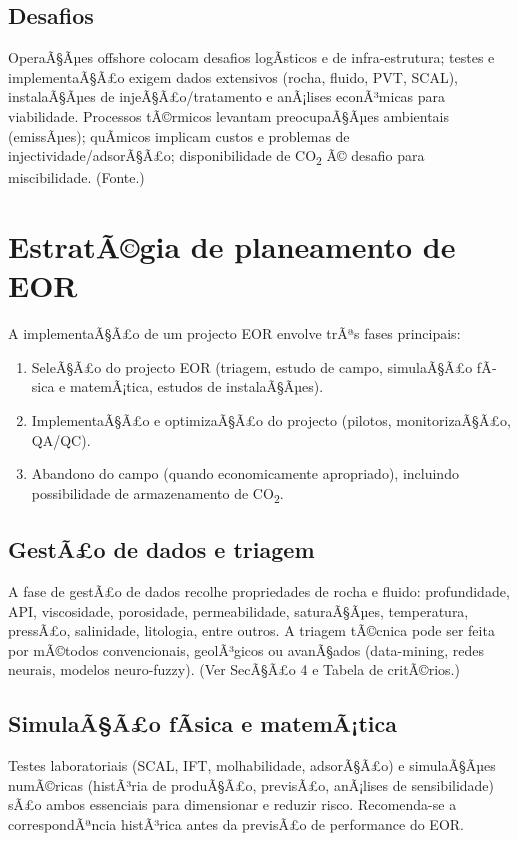\documentclass[11pt,a4paper]{article}
\begin{document}
\subsection{Desafios}
OperaÃ§Ãµes offshore colocam desafios logÃ­sticos e de infra-estrutura; testes e implementaÃ§Ã£o exigem dados extensivos (rocha, fluido, PVT, SCAL), instalaÃ§Ãµes de injeÃ§Ã£o/tratamento e anÃ¡lises econÃ³micas para viabilidade. Processos tÃ©rmicos levantam preocupaÃ§Ãµes ambientais (emissÃµes); quÃ­micos implicam custos e problemas de injectividade/adsorÃ§Ã£o; disponibilidade de CO\textsubscript{2} Ã© desafio para miscibilidade. (Fonte.)

\section{EstratÃ©gia de planeamento de EOR}
A implementaÃ§Ã£o de um projecto EOR envolve trÃªs fases principais:
\begin{enumerate}
	\item SeleÃ§Ã£o do projecto EOR (triagem, estudo de campo, simulaÃ§Ã£o fÃ­sica e matemÃ¡tica, estudos de instalaÃ§Ãµes).
	\item ImplementaÃ§Ã£o e optimizaÃ§Ã£o do projecto (pilotos, monitorizaÃ§Ã£o, QA/QC).
	\item Abandono do campo (quando economicamente apropriado), incluindo possibilidade de armazenamento de CO\textsubscript{2}.
\end{enumerate}

\subsection{GestÃ£o de dados e triagem}
A fase de gestÃ£o de dados recolhe propriedades de rocha e fluido: profundidade, API, viscosidade, porosidade, permeabilidade, saturaÃ§Ãµes, temperatura, pressÃ£o, salinidade, litologia, entre outros. A triagem tÃ©cnica pode ser feita por mÃ©todos convencionais, geolÃ³gicos ou avanÃ§ados (data-mining, redes neurais, modelos neuro-fuzzy). (Ver SecÃ§Ã£o 4 e Tabela de critÃ©rios.)

\subsection{SimulaÃ§Ã£o fÃ­sica e matemÃ¡tica}
Testes laboratoriais (SCAL, IFT, molhabilidade, adsorÃ§Ã£o) e simulaÃ§Ãµes numÃ©ricas (histÃ³ria de produÃ§Ã£o, previsÃ£o, anÃ¡lises de sensibilidade) sÃ£o ambos essenciais para dimensionar e reduzir risco. Recomenda-se a correspondÃªncia histÃ³rica antes da previsÃ£o de performance do EOR.
\end{document}
